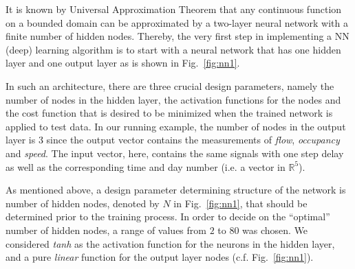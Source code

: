 \documentclass[twocolumn,10pt]{asme2e}
\begin{document}
It is known by Universal Approximation Theorem  \cite{universality} that any continuous function on a bounded domain can be approximated by a two-layer neural network with a finite number of hidden nodes. Thereby, the very first step in implementing a NN (deep) learning algorithm is to start with a neural network that has one hidden layer and one output layer as is shown in Fig.~\ref{fig:nn1}. 

In such an architecture, there are three crucial design parameters, namely the number of nodes in the hidden layer, the activation functions for the nodes and the cost function that is desired to be minimized when the trained network is applied to test data. In our running example, the number of nodes in the output layer is 3 since the output vector contains the measurements of \emph{flow}, \emph{occupancy} and \emph{speed}. The input vector, here, contains the same signals with one step delay as well as the corresponding time and day number (i.e. a vector in $\mathbb{R}^5$). 

As mentioned above, a design parameter determining structure of the network is number of hidden nodes, denoted by $N$ in Fig.~\ref{fig:nn1}, that should be determined prior to the training process. In order to decide on the ``optimal'' number of hidden nodes, a range of values from $2$ to $80$ was chosen. We considered \emph{tanh} as the activation function for the neurons in the hidden layer, and a pure \emph{linear} function for the output layer nodes (c.f. Fig.~\ref{fig:nn1}). 
\end{document}
